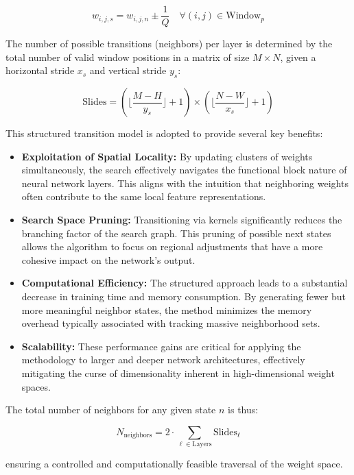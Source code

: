 $$w_{i,j, s} = w_{i,j, n} \pm \frac{1}{Q} \quad \forall (i,j) \in \text{Window}_{p}$$

The number of possible transitions (neighbors) per layer is determined by the total number of valid window positions in a matrix of size $M \times N$, given a horizontal stride $x_s$ and vertical stride $y_s$:

$$\text{Slides} = \left( \lfloor \frac{M - H}{y_s} \rfloor + 1 \right) \times \left( \lfloor \frac{N - W}{x_s} \rfloor + 1 \right)$$

This structured transition model is adopted to provide several key benefits:

\begin{itemize}
    \item \textbf{Exploitation of Spatial Locality:} By updating clusters of weights simultaneously, the search effectively navigates the functional block nature of neural network layers. This aligns with the intuition that neighboring weights often contribute to the same local feature representations.
    \item \textbf{Search Space Pruning:} Transitioning via kernels significantly reduces the branching factor of the search graph. This pruning of possible next states allows the algorithm to focus on regional adjustments that have a more cohesive impact on the network's output.
    \item \textbf{Computational Efficiency:} The structured approach leads to a substantial decrease in training time and memory consumption. By generating fewer but more meaningful neighbor states, the method minimizes the memory overhead typically associated with tracking massive neighborhood sets.
    \item \textbf{Scalability:} These performance gains are critical for applying the methodology to larger and deeper network architectures, effectively mitigating the curse of dimensionality inherent in high-dimensional weight spaces.
\end{itemize}

The total number of neighbors for any given state $n$ is thus:

$$N_{\text{neighbors}} = 2 \cdot \sum_{\ell \in \text{Layers}} \text{Slides}_{\ell}$$

ensuring a controlled and computationally feasible traversal of the weight space.

